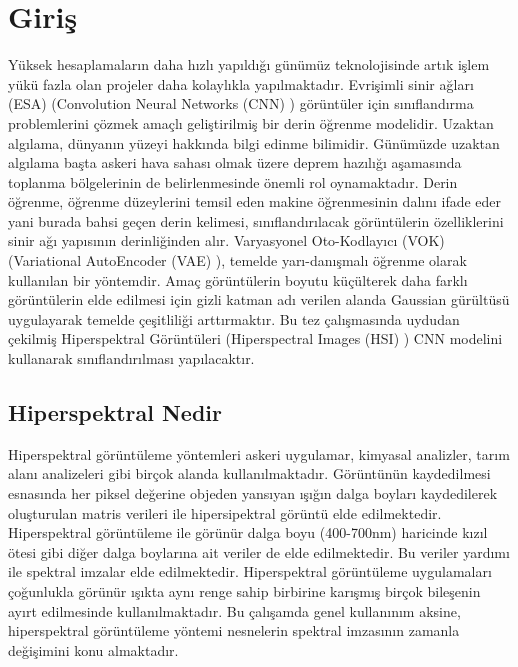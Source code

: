 \chapter{Giriş}
\thispagestyle{empty}

Yüksek hesaplamaların daha hızlı yapıldığı günümüz teknolojisinde artık işlem yükü fazla olan projeler daha kolaylıkla yapılmaktadır. Evrişimli sinir ağları (ESA) (Convolution Neural Networks (CNN) ) görüntüler için sınıflandırma problemlerini çözmek amaçlı geliştirilmiş bir derin öğrenme modelidir. Uzaktan algılama, dünyanın yüzeyi hakkında bilgi edinme bilimidir. Günümüzde uzaktan algılama başta askeri hava sahası olmak üzere deprem hazılığı aşamasında toplanma bölgelerinin de belirlenmesinde önemli rol oynamaktadır. Derin öğrenme, öğrenme düzeylerini temsil eden makine öğrenmesinin dalını ifade eder yani burada bahsi geçen derin kelimesi, sınıflandırılacak görüntülerin özelliklerini sinir ağı yapısının derinliğinden alır. Varyasyonel Oto-Kodlayıcı (VOK) (Variational AutoEncoder (VAE) ), temelde yarı-danışmalı öğrenme olarak kullanılan bir yöntemdir. Amaç görüntülerin boyutu küçülterek daha farklı görüntülerin elde edilmesi için gizli katman adı verilen alanda Gaussian gürültüsü uygulayarak temelde çeşitliliği arttırmaktır. Bu tez çalışmasında uydudan çekilmiş Hiperspektral Görüntüleri (Hiperspectral Images (HSI) ) CNN modelini kullanarak sınıflandırılması yapılacaktır.
\section{Hiperspektral Nedir}
Hiperspektral görüntüleme yöntemleri askeri uygulamar, kimyasal analizler, tarım alanı analizeleri gibi birçok alanda kullanılmaktadır. Görüntünün kaydedilmesi esnasında her piksel değerine objeden yansıyan ışığın dalga boyları kaydedilerek oluşturulan matris verileri ile hipersipektral görüntü elde edilmektedir. Hiperspektral görüntüleme ile görünür dalga boyu (400-700nm) haricinde kızıl ötesi gibi diğer dalga boylarına ait veriler de elde edilmektedir. Bu veriler yardımı ile spektral imzalar elde edilmektedir. Hiperspektral görüntüleme uygulamaları çoğunlukla görünür ışıkta aynı renge sahip birbirine karışmış birçok bileşenin ayırt edilmesinde kullanılmaktadır. Bu çalışamda genel kullanınım aksine, hiperspektral görüntüleme yöntemi nesnelerin spektral imzasının zamanla değişimini konu almaktadır. 
